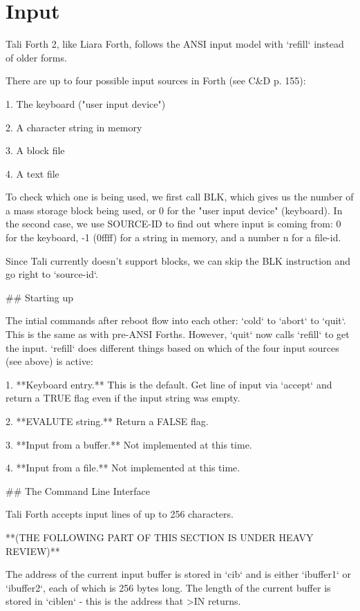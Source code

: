 \section{Input}



Tali Forth 2, like Liara Forth, follows the ANSI input model with
`refill` instead of older forms. 

There are up to four possible input sources in Forth (see C&D p. 155):

1. The keyboard ("user input device")

2. A character string in memory

3. A block file

4. A text file

To check which one is being used, we first call BLK, which gives us the number
of a mass storage block being used, or 0 for the "user input device" (keyboard).
In the second case, we use SOURCE-ID to find out where input is coming from: 0
for the keyboard, -1 (0ffff) for a string in memory, and a number n for a
file-id.

Since Tali currently doesn't support blocks, we can skip the BLK instruction and
go right to `source-id`. 


## Starting up

The intial commands after reboot flow into each other: `cold` to `abort` to
`quit`. This is the same as with pre-ANSI Forths. However, `quit` now calls
`refill` to get the input. `refill` does different things based on which of the
four input sources (see above) is active: 

1. **Keyboard entry.** This is the default. Get line of input via `accept` and
   return a TRUE flag even if the input string was empty.

2. **EVALUTE string.** Return a FALSE flag.

3. **Input from a buffer.** Not implemented at this time.

4. **Input from a file.** Not implemented at this time.


## The Command Line Interface

Tali Forth accepts input lines of up to 256 characters.

**(THE FOLLOWING PART OF THIS SECTION IS UNDER HEAVY REVIEW)**

The address of the current input buffer is stored in `cib` and is either 
`ibuffer1` or `ibuffer2`, each of which is 256 bytes long. The length of the
current buffer is stored in `ciblen` - this is the address that >IN returns. 

